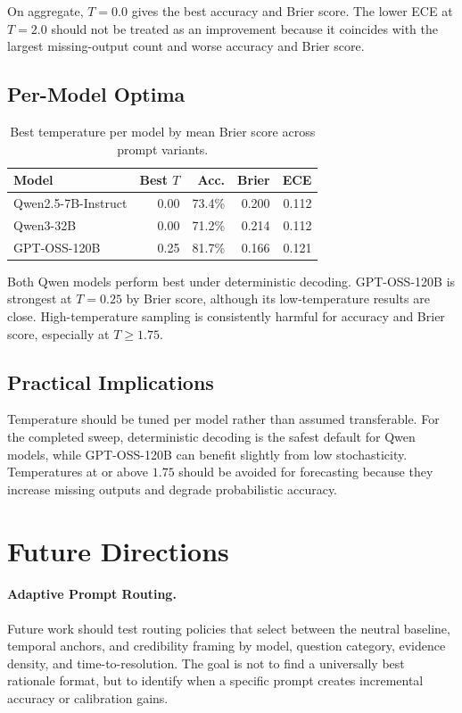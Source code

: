 \documentclass[11pt]{article}
\begin{document}
On aggregate, $T=0.0$ gives the best accuracy and Brier score.
The lower ECE at $T=2.0$ should not be treated as an improvement because it coincides with the largest missing-output count and worse accuracy and Brier score.

\subsection{Per-Model Optima}

\begin{table}[h]
\centering
\small
\begin{tabular}{lrrrr}
\toprule
\textbf{Model} & \textbf{Best $T$} & \textbf{Acc.} & \textbf{Brier} & \textbf{ECE} \\
\midrule
Qwen2.5-7B-Instruct & 0.00 & 73.4\% & 0.200 & 0.112 \\
Qwen3-32B & 0.00 & 71.2\% & 0.214 & 0.112 \\
GPT-OSS-120B & 0.25 & 81.7\% & 0.166 & 0.121 \\
\bottomrule
\end{tabular}
\caption{Best temperature per model by mean Brier score across prompt variants.}
\label{tab:temp-model-optima}
\end{table}

Both Qwen models perform best under deterministic decoding.
GPT-OSS-120B is strongest at $T=0.25$ by Brier score, although its low-temperature results are close.
High-temperature sampling is consistently harmful for accuracy and Brier score, especially at $T \geq 1.75$.

\subsection{Practical Implications}

Temperature should be tuned per model rather than assumed transferable.
For the completed sweep, deterministic decoding is the safest default for Qwen models, while GPT-OSS-120B can benefit slightly from low stochasticity.
Temperatures at or above $1.75$ should be avoided for forecasting because they increase missing outputs and degrade probabilistic accuracy.

\section{Future Directions}
\label{app:future_directions}

\paragraph{Adaptive Prompt Routing.}
Future work should test routing policies that select between the neutral baseline, temporal anchors, and credibility framing by model, question category, evidence density, and time-to-resolution.
The goal is not to find a universally best rationale format, but to identify when a specific prompt creates incremental accuracy or calibration gains.
\end{document}
